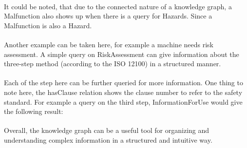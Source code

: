 \paragraph{} It could be noted, that due to the connected nature of a knowledge graph, a Malfunction also shows up when there is a query for Hazards. Since a Malfunction is also a Hazard.


\bigskip\bigskip {}

\paragraph{} Another example can be taken here, for example a machine needs risk assessment. A simple query on RiskAssessment can give information about the three-step method (according to the ISO 12100) in a structured manner.


\bigskip\bigskip {}

\paragraph{} Each of the step here can be further queried for more information. One thing to note here, the hasClause relation shows the clause number to refer to the safety standard. For example a query on the third step, InformationForUse would give the following result:


\bigskip\bigskip {}

\paragraph{} Overall, the knowledge graph can be a useful tool for organizing and understanding complex information in a structured and intuitive way.

